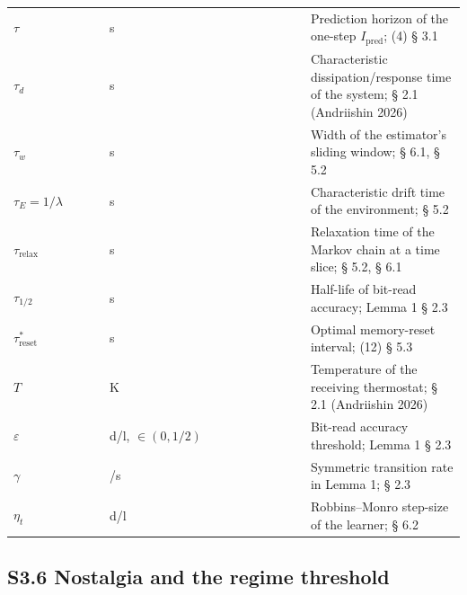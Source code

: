 \documentclass[pdflatex,sn-mathphys-ay]{sn-jnl}
\begin{document}
\begin{center}
\begin{tabular}{@{} >{\raggedright\arraybackslash}p{0.2105\linewidth} >{\raggedright\arraybackslash}p{0.4474\linewidth} >{\raggedright\arraybackslash}p{0.3421\linewidth}@{}}
\(\tau\) & s & Prediction horizon of the one-step \(I_{\text{pred}}\); (4) § 3.1 \\

\(\tau_d\) & s & Characteristic dissipation/response time of the system; § 2.1 (Andriishin 2026) \\

\(\tau_w\) & s & Width of the estimator's sliding window; § 6.1, § 5.2 \\

\(\tau_E = 1/\lambda\) & s & Characteristic drift time of the environment; § 5.2 \\

\(\tau_{\text{relax}}\) & s & Relaxation time of the Markov chain at a time slice; § 5.2, § 6.1 \\

\(\tau_{1/2}\) & s & Half-life of bit-read accuracy; Lemma 1 § 2.3 \\

\(\tau_{\text{reset}}^*\) & s & Optimal memory-reset interval; (12) § 5.3 \\

\(T\) & K & Temperature of the receiving thermostat; § 2.1 (Andriishin 2026) \\

\(\varepsilon\) & d/l, \(\in (0, 1/2)\) & Bit-read accuracy threshold; Lemma 1 § 2.3 \\

\(\gamma\) & 1/s & Symmetric transition rate in Lemma 1; § 2.3 \\

\(\eta_t\) & d/l & Robbins--Monro step-size of the learner; § 6.2 \\

\bottomrule
\end{tabular}
\end{center}


\subsection*{S3.6 Nostalgia and the regime threshold}\label{s3.6-nostalgia-and-the-regime-threshold}
\end{document}
